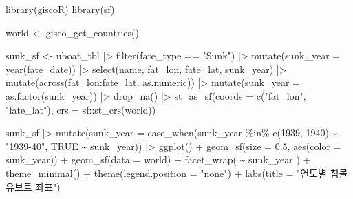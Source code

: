 \documentclass[
  letterpaper,
  chapter,a4paper,showtrims,openright,hidelinks]{oblivoir}
\newenvironment{Shaded}{\begin{snugshade}}{\end{snugshade}}
\newcommand{\AttributeTok}[1]{\textcolor[rgb]{0.40,0.45,0.13}{#1}}
\newcommand{\ConstantTok}[1]{\textcolor[rgb]{0.56,0.35,0.01}{#1}}
\newcommand{\DecValTok}[1]{\textcolor[rgb]{0.68,0.00,0.00}{#1}}
\newcommand{\FloatTok}[1]{\textcolor[rgb]{0.68,0.00,0.00}{#1}}
\newcommand{\FunctionTok}[1]{\textcolor[rgb]{0.28,0.35,0.67}{#1}}
\newcommand{\NormalTok}[1]{\textcolor[rgb]{0.00,0.23,0.31}{#1}}
\newcommand{\OtherTok}[1]{\textcolor[rgb]{0.00,0.23,0.31}{#1}}
\newcommand{\SpecialCharTok}[1]{\textcolor[rgb]{0.37,0.37,0.37}{#1}}
\newcommand{\StringTok}[1]{\textcolor[rgb]{0.13,0.47,0.30}{#1}}
\begin{document}
\begin{Shaded}
\begin{Highlighting}[]
\FunctionTok{library}\NormalTok{(giscoR)}
\FunctionTok{library}\NormalTok{(sf)}

\NormalTok{world }\OtherTok{\textless{}{-}} \FunctionTok{gisco\_get\_countries}\NormalTok{()}

\NormalTok{sunk\_sf }\OtherTok{\textless{}{-}}\NormalTok{ uboat\_tbl }\SpecialCharTok{|\textgreater{}} 
  \FunctionTok{filter}\NormalTok{(fate\_type  }\SpecialCharTok{==} \StringTok{"Sunk"}\NormalTok{)  }\SpecialCharTok{|\textgreater{}} 
  \FunctionTok{mutate}\NormalTok{(}\AttributeTok{sunk\_year =} \FunctionTok{year}\NormalTok{(fate\_date)) }\SpecialCharTok{|\textgreater{}} 
  \FunctionTok{select}\NormalTok{(name, fat\_lon, fate\_lat, sunk\_year) }\SpecialCharTok{|\textgreater{}} 
  \FunctionTok{mutate}\NormalTok{(}\FunctionTok{across}\NormalTok{(fat\_lon}\SpecialCharTok{:}\NormalTok{fate\_lat, as.numeric)) }\SpecialCharTok{|\textgreater{}} 
  \FunctionTok{mutate}\NormalTok{(}\AttributeTok{sunk\_year =} \FunctionTok{as.factor}\NormalTok{(sunk\_year)) }\SpecialCharTok{|\textgreater{}} 
  \FunctionTok{drop\_na}\NormalTok{() }\SpecialCharTok{|\textgreater{}} 
  \FunctionTok{st\_as\_sf}\NormalTok{(}\AttributeTok{coords =} \FunctionTok{c}\NormalTok{(}\StringTok{"fat\_lon"}\NormalTok{, }\StringTok{"fate\_lat"}\NormalTok{), }\AttributeTok{crs =}\NormalTok{ sf}\SpecialCharTok{::}\FunctionTok{st\_crs}\NormalTok{(world))}

\NormalTok{sunk\_sf }\SpecialCharTok{|\textgreater{}} 
  \FunctionTok{mutate}\NormalTok{(}\AttributeTok{sunk\_year =} \FunctionTok{case\_when}\NormalTok{(sunk\_year }\SpecialCharTok{\%in\%} \FunctionTok{c}\NormalTok{(}\DecValTok{1939}\NormalTok{, }\DecValTok{1940}\NormalTok{) }\SpecialCharTok{\textasciitilde{}} \StringTok{"1939{-}40"}\NormalTok{,}
                   \ConstantTok{TRUE} \SpecialCharTok{\textasciitilde{}}\NormalTok{ sunk\_year)) }\SpecialCharTok{|\textgreater{}} 
  \FunctionTok{ggplot}\NormalTok{() }\SpecialCharTok{+}
    \FunctionTok{geom\_sf}\NormalTok{(}\AttributeTok{size =} \FloatTok{0.5}\NormalTok{, }\FunctionTok{aes}\NormalTok{(}\AttributeTok{color =}\NormalTok{ sunk\_year)) }\SpecialCharTok{+}
    \FunctionTok{geom\_sf}\NormalTok{(}\AttributeTok{data =}\NormalTok{ world) }\SpecialCharTok{+}
    \FunctionTok{facet\_wrap}\NormalTok{( }\SpecialCharTok{\textasciitilde{}}\NormalTok{ sunk\_year ) }\SpecialCharTok{+}
    \FunctionTok{theme\_minimal}\NormalTok{() }\SpecialCharTok{+}
    \FunctionTok{theme}\NormalTok{(}\AttributeTok{legend.position =} \StringTok{"none"}\NormalTok{) }\SpecialCharTok{+}
    \FunctionTok{labs}\NormalTok{(}\AttributeTok{title =} \StringTok{"연도별 침몰 유보트 좌표"}\NormalTok{)}
\end{Highlighting}
\end{Shaded}
\end{document}
